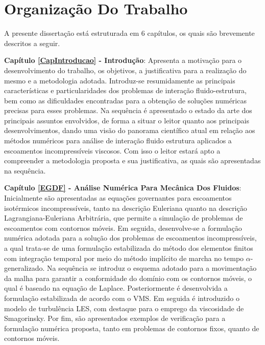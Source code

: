 \section{Organização Do Trabalho}

A presente dissertação está estruturada em 6 capítulos, os quais são brevemente descritos a seguir.

    {
        \newcommand{\Capi}[2]{\textbf{Capítulo #1 - #2}:}

        \Capi{\ref{CapIntroducao}}{Introdução} Apresenta a motivação para o desenvolvimento do trabalho, os objetivos, a justificativa para a realização do mesmo e a metodologia adotada. Introduz-se resumidamente as principais características e particularidades dos problemas de interação fluido-estrutura, bem como as dificuldades encontradas para a obtenção de soluções numéricas precisas para esses problemas. Na sequência é apresentado o estado da arte dos principais assuntos envolvidos, de forma a situar o leitor quanto aos principais desenvolvimentos, dando uma visão do panorama científico atual em relação aos métodos numéricos para análise de interação fluido estrutura aplicados a escoamentos incompressíveis viscosos. Com isso o leitor estará apto a compreender a metodologia proposta e sua justificativa, as quais são apresentadas na sequência.

        \Capi{\ref{EGDF}}{Análise Numérica Para Mecânica Dos Fluidos} Inicialmente são apresentadas as equações governantes para escoamentos isotérmicos incompressíveis, tanto na descrição Euleriana quanto na descrição Lagrangiana-Euleriana Arbitrária, que permite a simulação de problemas de escoamentos com contornos móveis. Em seguida, desenvolve-se a formulação numérica adotada para a solução dos problemas de escoamentos incompressíveis, a qual trata-se de uma formulação estabilizada do método dos elementos finitos com integração temporal por meio do método implícito de marcha no tempo $\alpha$-generalizado. Na sequência se introduz o esquema adotado para a movimentação da malha para garantir a conformidade do domínio com os contornos móveis, o qual é baseado na equação de Laplace. Posteriormente é desenvolvida a formulação estabilizada de acordo com o VMS. Em seguida é introduzido o modelo de turbulência LES, com destaque para o emprego da viscosidade de Smagorinsky. Por fim, são apresentados exemplos de verificação para a formulação numérica proposta, tanto em problemas de contornos fixos, quanto de contornos móveis.

}
